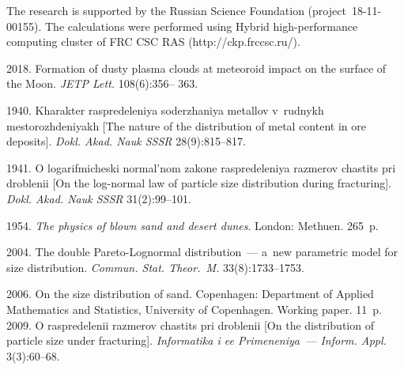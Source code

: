 \Ack
\noindent
The research is supported by the Russian Science Foundation 
(project~18-11-00155). The calculations were performed using Hybrid high-performance 
computing cluster of FRC CSC RAS ({\sf http://ckp.frccsc.ru/}).


 \begin{multicols}{2}

\renewcommand{\bibname}{\protect\rmfamily References}

{\small\frenchspacing
 {%
 \begin{thebibliography}{99}


 2018.
Formation of dusty plasma clouds at meteoroid impact on the surface of 
the Moon. \textit{JETP Lett.} 108(6):356--
363.

 1940. Kharakter raspredeleniya soderzhaniya 
metallov v~rudnykh mestorozhdeniyakh [The nature of the distribution of 
metal content in ore deposits]. \textit{Dokl. Akad. Nauk SSSR}  28(9):815--817. 

 1941. O logarifmicheski normal'nom zakone 
raspredeleniya razmerov chastits pri droblenii [On the log-normal law of 
particle size distribution during fracturing]. \textit{Dokl. Akad. Nauk 
SSSR} 31(2):99--101.


 1954. \textit{The physics of blown sand and desert 
dunes}. London: Methuen. 265~p.

 2004. The double Pareto-Lognormal 
distribution~--- a~new parametric model for size distribution. 
\textit{Commun. Stat. Theor.~M.} 33(8):1733--1753.

 2006. {On the size distribution of 
sand}. Copenhagen: Department of Applied Mathematics and Statistics,
University of Copenhagen. Working paper. 11~p.
 2009. O raspredelenii razmerov chastits pri 
droblenii [On the distribution of particle size under fracturing]. 
\textit{Informatika i ee Primeneniya~--- Inform. Appl.} 3(3):60--68. 


\end{thebibliography}}}
\end{multicols}
